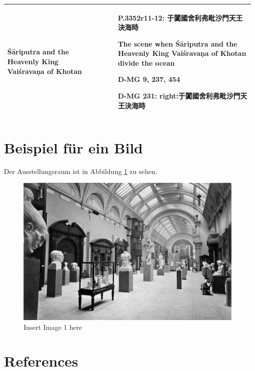 \documentclass[
  english,
  a4paper,
  DIV=12,
  footlines=2.1,
  usegeometry=true]{scrartcl}
\begin{document}
\begin{longtable}[]{@{}llll@{}}
\begin{minipage}[t]{0.18\columnwidth}
Śāriputra and the Heavenly King Vaiśravaṇa of Khotan\strut
\end{minipage} & \begin{minipage}[t]{0.13\columnwidth}\raggedright
\strut
\end{minipage} & \begin{minipage}[t]{0.13\columnwidth}\raggedright
\strut
\end{minipage} & \begin{minipage}[t]{0.44\columnwidth}\raggedright
P.3352r11-12: 于闐國舍利弗毗沙門天王決海時

The scene when Śāriputra and the Heavenly King Vaiśravaṇa of Khotan
divide the ocean

D-MG 9, 237, 454

D-MG 231: right:于闐國舍利弗毗沙門天王決海時\strut
\end{minipage}\tabularnewline
\bottomrule
\end{longtable}

\hypertarget{beispiel-fuxfcr-ein-bild}{%
\section{Beispiel für ein Bild}\label{beispiel-fuxfcr-ein-bild}}

\leavevmode\marginpar{\textcolor{parnum}{{[}22{]}}}Der Ausstellungsraum
ist in Abbildung \ref{fig:img1} zu sehen.

\begin{figure}
\hypertarget{fig:img1}{%
\centering
\includegraphics{Image 1.tif}
\caption{Insert Image 1 here}\label{fig:img1}
}
\end{figure}

\hypertarget{bibliography}{%
\section*{References}\label{bibliography}}
\end{document}
